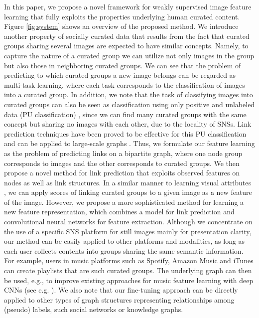 \documentclass[letterpaper]{article} %
\begin{document}
In this paper, we propose a novel framework for weakly supervised image feature learning that fully exploits the properties underlying human curated content.
%
Figure \ref{fig:system} shows an overview of the proposed method.
%
We introduce another property of socially curated data that results from the fact that curated groups sharing several images are expected to have similar concepts.
%
Namely, to capture the nature of a curated group we can utilize not only images in the group but also those in neighboring curated groups.
%
We can see that the problem of predicting to which curated groups a new image belongs can be regarded as multi-task learning, where each task corresponds to the classification of images into a curated group.
%
In addition, we note that the task of classifying images into curated groups can also be seen as classification using only positive and unlabeled data (PU classification) \cite{dePlessis2015}, since we can find many curated groups with the same concept but sharing no images with each other, due to the locality of SNSs.
%
Link prediction techniques have been proved to be effective for this PU classification \cite{Chang2016} and can be applied to large-scale graphs \cite{Menon2011}.
%
Thus, we formulate our feature learning as the problem of predicting links on a bipartite graph, where one node group corresponds to images and the other corresponds to curated groups.
%
We then propose a novel method for link prediction that exploits observed features on nodes as well as link structures.
%
In a similar manner to learning visual attributes \cite{Farhadi2009}, we can apply scores of linking curated groups to a given image as a new feature of the image.
%
However, we propose a more sophisticated method for learning a new feature representation, which combines a model for link prediction and convolutional neural networks for feature extraction.
%
Although we concentrate on the use of a specific SNS platform for still images mainly for presentation clarity, our method can be easily applied to other platforms and modalities, as long as each user collects contents into groups sharing the same semantic information.
%
For example, users in music platforms such as Spotify, Amazon Music and iTunes can create playlists that are such curated groups.
%
The underlying graph can then be used, e.g., to improve existing approaches for music feature learning with deep CNNs (see e.g. \cite{Lee2009}).
%
We also note that our fine-tuning approach can be directly applied to other types of graph structures representing relationships among (pseudo) labels, such social networks or knowledge graphs.
\end{document}
